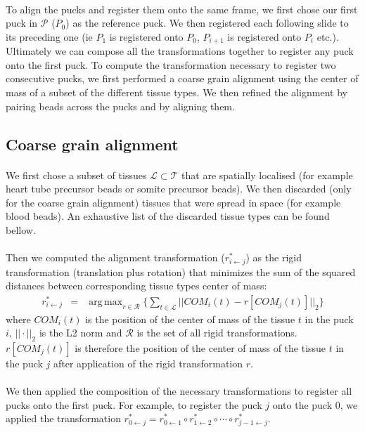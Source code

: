 \documentclass[10pt,a4paper]{article}
\DeclareMathOperator*{\argmax}{arg\,max}
\begin{document}
\paragraph{}To align the pucks and register them onto the same frame, we first chose our first puck in \(\mathcal{P}\) (\(P_0\)) as the reference puck.
We then registered each following slide to its preceding one (ie \(P_1\) is registered onto \(P_0\), \(P_{i+1}\) is registered onto \(P_{i}\) etc.).
Ultimately we can compose all the transformations together to register any puck onto the first puck.
To compute the transformation necessary to register two consecutive pucks, we first performed a coarse grain alignment using the center of mass of a subset of the different tissue types.
We then refined the alignment by pairing beads across the pucks and by aligning them.
\subsection{Coarse grain alignment}
\paragraph{}We first chose a subset of tissues \(\mathcal{L}\subset\mathcal{T}\) that are spatially localised (for example heart tube precursor beads or {\color{red}somite precursor} beads). 
We then discarded (only for the coarse grain alignment) tissues that were spread in space (for example {\color{red}blood} beads).
An exhaustive list of the discarded tissue types can be found bellow.
\paragraph{}Then we computed the alignment transformation (\(r_{i\leftarrow j}^*\)) as the rigid transformation (translation plus rotation) that minimizes the sum of the squared distances between corresponding tissue types center of mass:
\begin{eqnarray}\label{eq:rigid}
r_{i\leftarrow j}^*&=&\argmax_{r\in\mathcal{R}} \big\{\sum_{t\in \mathcal{L}}||COM_i(t)-r[COM_j(t)]||_2\big\}
\end{eqnarray}
where \(COM_i(t)\) is the position of the center of mass of the tissue \(t\) in the puck \(i\), \(||\cdot||_2\) is the L2 norm and \(\mathcal{R}\) is the set of all rigid transformations.
\(r[COM_j(t)]\) is therefore the position of the center of mass of the tissue \(t\) in the puck \(j\) after application of the rigid transformation \(r\).
\paragraph{}We then applied the composition of the necessary transformations to register all pucks onto the first puck.
For example, to register the puck \(j\) onto the puck \(0\), we applied the transformation \(r_{0\leftarrow j}^*=r_{0\leftarrow 1}^*\circ r_{1\leftarrow 2}^*\circ \cdots \circ r_{j-1\leftarrow j}^*\).
\end{document}
